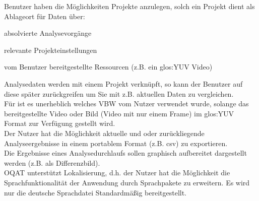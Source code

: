  Benutzer haben die Möglichkeiten Projekte anzulegen, solch ein Projekt dient als Ablageort für Daten über:
\begin{compactitem}
\item absolvierte Analysevorgänge
\item relevante Projekteinstellungen
\item vom Benutzer bereitgestellte Ressourcen (z.B. ein \gls{glos:YUV} Video)
\end{compactitem}
 	Analysedaten werden mit einem Projekt verknüpft, so kann der Benutzer auf diese später zurückgreifen um Sie mit z.B. aktuellen Daten zu vergleichen.\\
 Für \projektTitel ist es unerheblich welches \gls{VBW} vom Nutzer verwendet wurde, solange das bereitgestellte Video oder Bild (Video mit nur einem Frame) im \gls{glos:YUV} Format zur Verfügung gestellt wird.\\
 Der Nutzer hat die Möglichkeit aktuelle und oder zurückliegende Analyseergebnisse in einem portablem Format (z.B. \gls{csv}) zu exportieren.\\
 Die Ergebnisse eines Analysedurchlaufs sollen graphisch aufbereitet dargestellt werden (z.B. als Differenzbild).\\
 \gls{OQAT} unterstützt Lokalisierung, d.h. der Nutzer hat die Möglichkeit die Sprachfunktionalität der Anwendung durch Sprachpakete zu erweitern. Es wird nur die deutsche Sprachdatei Standardmäßig bereitgestellt.
